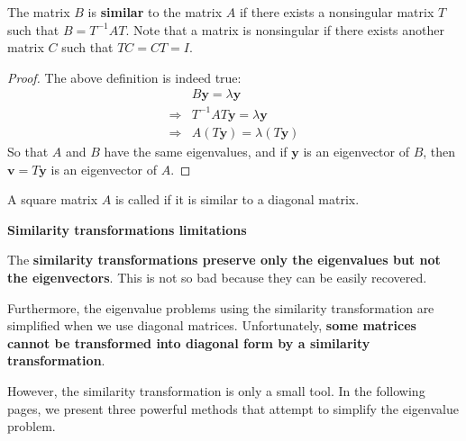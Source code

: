 \begin{definitionbox}
    The matrix $B$ is \textbf{similar} to the matrix $A$ if there exists a nonsingular matrix $T$ such that $B = T^{-1} A T$. Note that a matrix is nonsingular if there exists another matrix $C$ such that $TC = CT = I$.
\end{definitionbox}

\begin{proof}
    The above definition is indeed true:
    \begin{equation*}
        \begin{array}{ll}
            & B\mathbf{y} = \lambda\mathbf{y} \\ [.3em]
            \Longrightarrow & T^{-1} A T \mathbf{y} = \lambda\mathbf{y} \\ [.3em]
            \Longrightarrow & A \left(T \mathbf{y}\right) = \lambda\left(T \mathbf{y}\right)
        \end{array}
    \end{equation*}
    So that $A$ and $B$ have the same eigenvalues, and if $\mathbf{y}$ is an eigenvector of $B$, then $\mathbf{v} = T\mathbf{y}$ is an eigenvector of $A$.
\end{proof}

\noindent
A square matrix $A$ is called  if it is similar to a diagonal matrix.

\highspace
\begin{flushleft}
    \textcolor{Red2}{ \textbf{Similarity transformations limitations}}
\end{flushleft}
The \textbf{similarity transformations preserve only the eigenvalues but not the eigenvectors}. This is not so bad because they can be easily recovered.

\highspace
Furthermore, the eigenvalue problems using the similarity transformation are simplified when we use diagonal matrices. Unfortunately, \textbf{some matrices cannot be transformed into diagonal form by a similarity transformation}.

\highspace
However, the similarity transformation is only a small tool. In the following pages, we present three powerful methods that attempt to simplify the eigenvalue problem.
